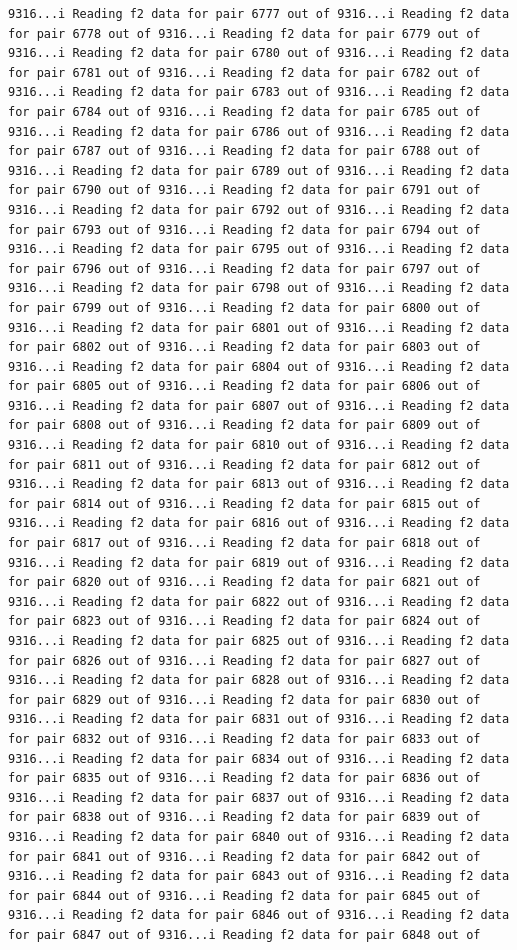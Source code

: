 \documentclass[
]{article}
\begin{document}
\begin{verbatim}
9316...i Reading f2 data for pair 6777 out of 9316...i Reading f2 data for pair 6778 out of 9316...i Reading f2 data for pair 6779 out of 9316...i Reading f2 data for pair 6780 out of 9316...i Reading f2 data for pair 6781 out of 9316...i Reading f2 data for pair 6782 out of 9316...i Reading f2 data for pair 6783 out of 9316...i Reading f2 data for pair 6784 out of 9316...i Reading f2 data for pair 6785 out of 9316...i Reading f2 data for pair 6786 out of 9316...i Reading f2 data for pair 6787 out of 9316...i Reading f2 data for pair 6788 out of 9316...i Reading f2 data for pair 6789 out of 9316...i Reading f2 data for pair 6790 out of 9316...i Reading f2 data for pair 6791 out of 9316...i Reading f2 data for pair 6792 out of 9316...i Reading f2 data for pair 6793 out of 9316...i Reading f2 data for pair 6794 out of 9316...i Reading f2 data for pair 6795 out of 9316...i Reading f2 data for pair 6796 out of 9316...i Reading f2 data for pair 6797 out of 9316...i Reading f2 data for pair 6798 out of 9316...i Reading f2 data for pair 6799 out of 9316...i Reading f2 data for pair 6800 out of 9316...i Reading f2 data for pair 6801 out of 9316...i Reading f2 data for pair 6802 out of 9316...i Reading f2 data for pair 6803 out of 9316...i Reading f2 data for pair 6804 out of 9316...i Reading f2 data for pair 6805 out of 9316...i Reading f2 data for pair 6806 out of 9316...i Reading f2 data for pair 6807 out of 9316...i Reading f2 data for pair 6808 out of 9316...i Reading f2 data for pair 6809 out of 9316...i Reading f2 data for pair 6810 out of 9316...i Reading f2 data for pair 6811 out of 9316...i Reading f2 data for pair 6812 out of 9316...i Reading f2 data for pair 6813 out of 9316...i Reading f2 data for pair 6814 out of 9316...i Reading f2 data for pair 6815 out of 9316...i Reading f2 data for pair 6816 out of 9316...i Reading f2 data for pair 6817 out of 9316...i Reading f2 data for pair 6818 out of 9316...i Reading f2 data for pair 6819 out of 9316...i Reading f2 data for pair 6820 out of 9316...i Reading f2 data for pair 6821 out of 9316...i Reading f2 data for pair 6822 out of 9316...i Reading f2 data for pair 6823 out of 9316...i Reading f2 data for pair 6824 out of 9316...i Reading f2 data for pair 6825 out of 9316...i Reading f2 data for pair 6826 out of 9316...i Reading f2 data for pair 6827 out of 9316...i Reading f2 data for pair 6828 out of 9316...i Reading f2 data for pair 6829 out of 9316...i Reading f2 data for pair 6830 out of 9316...i Reading f2 data for pair 6831 out of 9316...i Reading f2 data for pair 6832 out of 9316...i Reading f2 data for pair 6833 out of 9316...i Reading f2 data for pair 6834 out of 9316...i Reading f2 data for pair 6835 out of 9316...i Reading f2 data for pair 6836 out of 9316...i Reading f2 data for pair 6837 out of 9316...i Reading f2 data for pair 6838 out of 9316...i Reading f2 data for pair 6839 out of 9316...i Reading f2 data for pair 6840 out of 9316...i Reading f2 data for pair 6841 out of 9316...i Reading f2 data for pair 6842 out of 9316...i Reading f2 data for pair 6843 out of 9316...i Reading f2 data for pair 6844 out of 9316...i Reading f2 data for pair 6845 out of 9316...i Reading f2 data for pair 6846 out of 9316...i Reading f2 data for pair 6847 out of 9316...i Reading f2 data for pair 6848 out of 
\end{verbatim}
\end{document}
